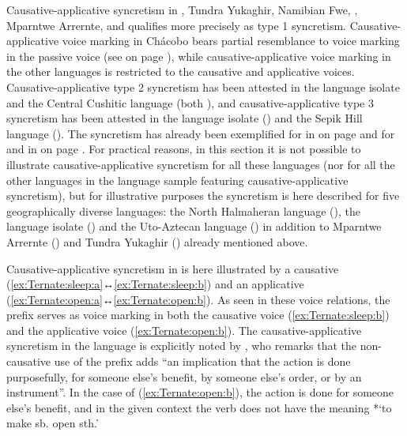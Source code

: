 \hspace*{-1mm}Causative-applicative syncretism in , Tundra Yukaghir, Namibian Fwe, , Mparntwe Arrernte, and  qualifies more precisely as type 1 syncretism. Causative-applicative voice marking in Chácobo bears partial resemblance to voice marking in the passive voice (see  on page \pageref{tab:ch5:caus-appl-pass}), while causative-applicative voice marking in the other languages is restricted to the causative and applicative voices. Causative-applicative type 2 syncretism has been attested in the language isolate  and the Central Cushitic language  (both ), and causative-applicative type 3 syncretism has been attested in the language isolate  () and the Sepik Hill language  (). The syncretism has already been exemplified for  in  on page \pageref{tab:ch3:type2-examples} and for  and  in  on page \pageref{tab:ch3:type3-examples}. For practical reasons, in this section it is not possible to illustrate causative-applicative syncretism for all these languages (nor for all the other languages in the language sample featuring causative-applicative syncretism), but for illustrative purposes the syncretism is here described for five geographically diverse languages: the North Halmaheran language  (), the language isolate  () and the Uto-Aztecan language  () in addition to Mparntwe Arrernte () and Tundra Yukaghir () already mentioned above.

Causative-applicative syncretism in  is here illustrated by a causative  (\ref{ex:Ternate:sleep:a}↔\ref{ex:Ternate:sleep:b}) and an applicative  (\ref{ex:Ternate:open:a}↔\ref{ex:Ternate:open:b}). As seen in these voice relations, the prefix  serves as voice marking in both the causative voice (\ref{ex:Ternate:sleep:b}) and the applicative voice (\ref{ex:Ternate:open:b}). The causative-applicative syncretism in the language is explicitly noted by \citet[132]{hayami-allen:2001}, who remarks that the non-causative use of the prefix adds “an implication that the action is done purposefully, for someone else’s benefit, by someone else’s order, or by an instrument”. In the case of (\ref{ex:Ternate:open:b}), the action is done for someone else’s benefit, and in the given context the verb  does not have the meaning *‘to make sb. open sth.’

